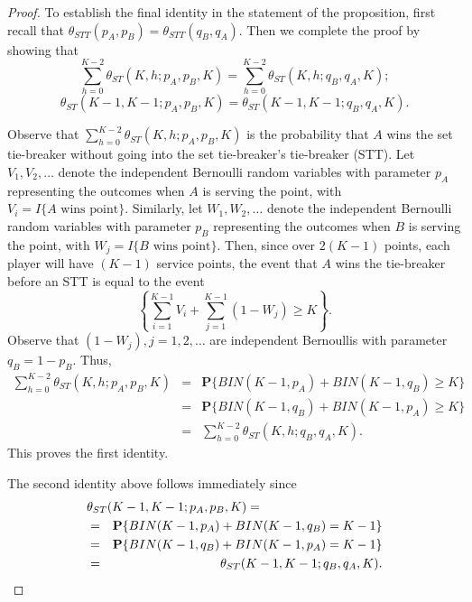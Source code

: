 \documentclass[10pt,a4paper]{amsart}
\newcommand{\BLUE}[1]{{\color{blue} #1}}
\renewcommand{\Pr}{\mathbf{P}}
\newcommand{\RED}[1]{{\color{red} #1}}
\begin{document}
\begin{proof}
{\RED{To establish the final identity in the statement of the proposition, first recall that $\theta_{STT}(p_A,p_B) = \theta_{STT}(q_B,q_A)$. Then we complete the proof by showing that
%
$$\sum_{h=0}^{K-2} \theta_{ST}(K,h;p_A,p_B,K) = \sum_{h=0}^{K-2} \theta_{ST}(K,h;q_B,q_A,K);$$
$$\theta_{ST}(K-1,K-1;p_A,p_B,K) = \theta_{ST}(K-1,K-1;q_B,q_A,K).$$

\BLUE{
Observe that $\sum_{h=0}^{K-2} \theta_{ST}(K,h;p_A,p_B,K)$ is the probability that $A$ wins the set tie-breaker without going into the set tie-breaker's tie-breaker (STT). Let $V_1, V_2, \ldots$ denote the independent Bernoulli random variables with parameter $p_A$ representing the outcomes when $A$ is serving the point, with $V_i = I\{\mbox{$A$ wins point}\}$. Similarly, let $W_1, W_2, \ldots$ denote the independent Bernoulli random variables with parameter $p_B$ representing the outcomes when $B$ is serving the point, with $W_j = I\{\mbox{$B$ wins point}\}$. Then, since over $2(K-1)$ points, each player will have $(K-1)$ service points, the event that $A$ wins the tie-breaker before an STT is equal to the event
%
$$\left\{ \sum_{i=1}^{K-1} V_i + \sum_{j=1}^{K-1} (1-W_j) \ge K\right\}.$$
%
Observe that $(1-W_j), j=1,2,\ldots$ are independent Bernoullis with parameter $q_B = 1 - p_B$. Thus,
%
\begin{eqnarray*}
\sum_{h=0}^{K-2} \theta_{ST}(K,h;p_A,p_B,K) & = &
\Pr\{BIN(K-1,p_A) + BIN(K-1,q_B) \ge K\} \\
& = & \Pr\{BIN(K-1,q_B) + BIN(K-1,p_A) \ge K\} \\
& = &\sum_{h=0}^{K-2} \theta_{ST}(K,h;q_B,q_A,K).
\end{eqnarray*}
%
This proves the first identity.

The second identity above follows immediately since
\begin{eqnarray*}
\lefteqn{ \theta_{ST}(K-1,K-1;p_A,p_B,K)  = } \\
& = &\Pr\{BIN(K-1,p_A) + BIN(K-1,q_B) =  K-1\} \\
& = & \Pr\{BIN(K-1,q_B) + BIN(K-1,p_A) = K-1\} \\
& = & \theta_{ST}(K-1,K-1;q_B,q_A,K).
\end{eqnarray*}
}}


}
\end{proof}
\end{document}

